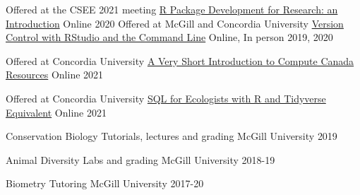 

\begin{cventries}

  \cventry
    {Offered at the CSEE 2021 meeting} %
    {\href{https://github.com/VLucet/R_pkg_dev_for_research_CSEE_2021}{R Package Development for Research: an Introduction}} %
    {Online} %
    {2020} %
    {}
  \cventry
  {Offered at McGill and Concordia University} %
  {\href{https://github.com/VLucet/git-and-github-with-r-workshop}{Version Control with RStudio and the Command Line}} %
  {Online, In person} %
  {2019, 2020} %
  {}

    \cventry
    {Offered at Concordia University} %
    {\href{https://github.com/VLucet/ComputeCanada-short-intro}{A Very Short Introduction to Compute Canada Resources}} %
    {Online} %
    {2021} %
    {}  

  \cventry
  {Offered at Concordia University} %
  {\href{https://github.com/VLucet/sql-workshop-for-ecologists}{SQL for Ecologists with R and Tidyverse Equivalent}} %
  {Online} %
  {2021} %
  {}

\end{cventries}


\begin{cvhonors}

      \cvhonor
        {Conservation Biology} %
        {Tutorials, lectures and grading} %
        {McGill University} %
        {2019} %
    
      \cvhonor
        {Animal Diversity} %
        {Labs and grading} %
        {McGill University} %
        {2018-19} %
    
    \cvhonor
        {Biometry} %
        {Tutoring} %
        {McGill University} %
        {2017-20} %

\end{cvhonors}
    